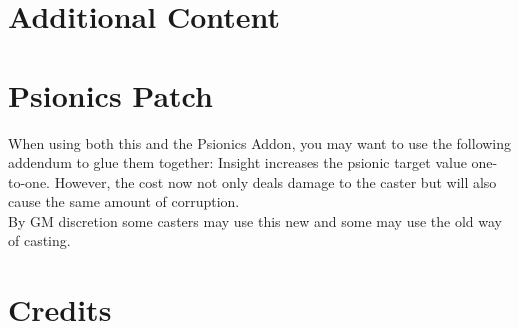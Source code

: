 \documentclass[12pt,a4paper,openany]{book}
\begin{document}
	\chapter{Additional Content}
	
	
	\chapter{Psionics Patch}
	When using both this and the Psionics Addon, you may want to use the following addendum to glue them together: 
	Insight increases the psionic target value one-to-one. However, the cost now not only deals damage to the caster but will also cause the same amount of corruption.\\
	By GM discretion some casters may use this new and some may use the old way of casting.
	
	\chapter{Credits}
	
\end{document}
